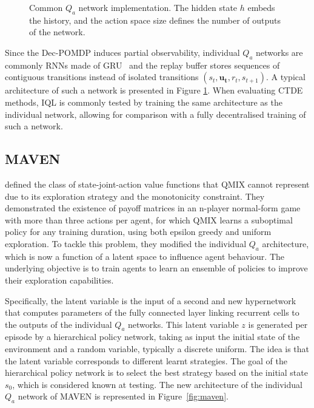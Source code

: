 \begin{figure}
    \centering

\caption{Common $Q_a$ network implementation. The hidden state $h$ embeds the history, and the action space size defines the number of outputs of the network.}
\label{fig:ch3_indivQ}
\end{figure}

Since the Dec-POMDP induces partial observability, individual $Q_a$ networks are commonly RNNs made of GRU~\citep{Chung2014EmpiricalModeling} and the replay buffer stores sequences of contiguous transitions instead of isolated transitions $( s_{t},\mathbf{u_{t}},r_{t},s_{t+1})$.
A typical architecture of such a network is presented in Figure \ref{fig:ch3_indivQ}.
When evaluating CTDE methods, IQL is commonly tested by training the same architecture as the individual network, allowing for comparison with a fully decentralised training of such a network.

\subsection{MAVEN}
\citet{Mahajan2019MAVEN:Exploration} defined the class of state-joint-action value functions that QMIX cannot represent due to its exploration strategy and the monotonicity constraint.
They demonstrated the existence of payoff matrices in an n-player normal-form game with more than three actions per agent, for which QMIX learns a suboptimal policy for any training duration, using both epsilon greedy and uniform exploration.
To tackle this problem, they modified the individual $Q_a$ architecture, which is now a function of a latent space to influence agent behaviour.
The underlying objective is to train agents to learn an ensemble of policies to improve their exploration capabilities.

Specifically, the latent variable is the input of a second and new hypernetwork that computes parameters of the fully connected layer linking recurrent cells to the outputs of the individual $Q_a$ networks.
This latent variable $z$ is generated per episode by a hierarchical policy network, taking as input the initial state of the environment and a random variable, typically a discrete uniform.
The idea is that the latent variable corresponds to different learnt strategies.
The goal of the hierarchical policy network is to select the best strategy based on the initial state $s_0$, which is considered known at testing.
The new architecture of the individual $Q_a$ network of MAVEN is represented in Figure~\ref{fig:maven}.

